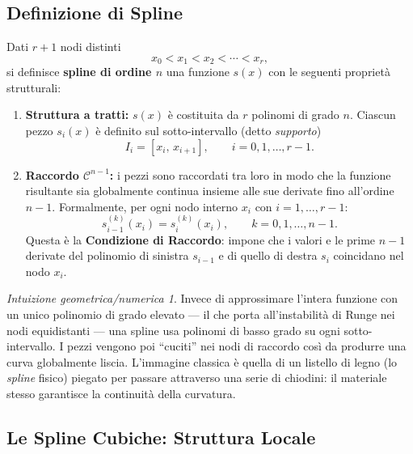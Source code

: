 \documentclass[a4paper,12pt]{article}
\theoremstyle{definition}
\theoremstyle{remark}
\newtheorem*{intuizione}{Intuizione geometrica/numerica}
\begin{document}
\subsection{Definizione di Spline}

Dati $r+1$ nodi distinti
\[
  x_0 < x_1 < x_2 < \cdots < x_r,
\]
si definisce \textbf{spline di ordine $n$} una funzione $s(x)$ con le
seguenti proprietà strutturali:
\begin{enumerate}
  \item \textbf{Struttura a tratti:} $s(x)$ è costituita da $r$ polinomi
        di grado $n$. Ciascun pezzo $s_i(x)$ è definito sul sotto-intervallo
        (detto \emph{supporto})
        \[
          I_i = [x_i,\, x_{i+1}], \qquad i = 0, 1, \ldots, r-1.
        \]

  \item \textbf{Raccordo $\mathcal{C}^{n-1}$:} i pezzi sono raccordati
        tra loro in modo che la funzione risultante sia globalmente continua
        insieme alle sue derivate fino all'ordine $n-1$.
        Formalmente, per ogni nodo interno $x_i$ con $i = 1, \ldots, r-1$:
        \begin{equation}
          s_{i-1}^{(k)}(x_i) = s_i^{(k)}(x_i),
          \qquad k = 0, 1, \ldots, n-1.
          \label{eq:raccordo-generale}
        \end{equation}
        Questa è la \textbf{Condizione di Raccordo}: impone che i valori e
        le prime $n-1$ derivate del polinomio di sinistra $s_{i-1}$ e di
        quello di destra $s_i$ coincidano nel nodo $x_i$.
\end{enumerate}

\begin{intuizione}
Invece di approssimare l'intera funzione con un unico polinomio di grado
elevato --- il che porta all'instabilità di Runge nei nodi equidistanti ---
una spline usa polinomi di basso grado su ogni sotto-intervallo. I pezzi
vengono poi ``cuciti'' nei nodi di raccordo così da produrre una curva
globalmente liscia. L'immagine classica è quella di un listello di legno
(lo \emph{spline} fisico) piegato per passare attraverso una serie di
chiodini: il materiale stesso garantisce la continuità della curvatura.
\end{intuizione}

\subsection{Le Spline Cubiche: Struttura Locale}
\end{document}
